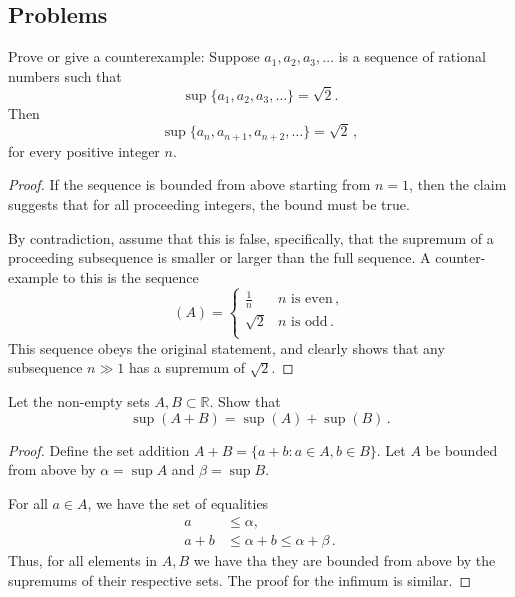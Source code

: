 \subsection{Problems}
\begin{problem}
    Prove or give a counterexample: Suppose
$a_1, a_2, a_3, \dots$ is a sequence of rational numbers such that
\[
  \sup\{a_1, a_2, a_3, \dots\} = \sqrt{2}.
\]
Then
\[
  \sup\{a_n, a_{n+1}, a_{n+2}, \dots\} = \sqrt{2}\,,
\]
for every positive integer $n$.
\end{problem}
\begin{proof}
    If the sequence is bounded from above starting from $n=1$, then the claim suggests that for all proceeding integers, the bound must be true. 

    By contradiction, assume that this is false, specifically, that the supremum of a proceeding subsequence is smaller or larger than the full sequence. A counter-example to this is the sequence
    \begin{equation*}
        (A) = \begin{cases}
            \frac{1}{n} & \text{$n$ is even}\,, \\
            \sqrt{2} & \text{$n$ is odd}\,. \\
        \end{cases}
    \end{equation*}
    This sequence obeys the original statement, and clearly shows that any subsequence $n \gg 1$ has a supremum of $\sqrt{2}$.
\end{proof}
\fullpageboxline
\begin{problem}
    Let the non-empty sets $A, B \subset \mathbb{R}$. Show that \begin{equation*}
        \sup(A + B) = \sup(A) + \sup(B)\,.
    \end{equation*}
\end{problem}
\begin{proof}
    Define the set addition $A + B = \{a + b: a \in A, b \in B\}$. Let $A$ be bounded from above by $\alpha = \sup{A}$ and $\beta = \sup B$.

    For all $a \in A$, we have the set of equalities 
    \begin{align*}
        a &\leq \alpha,\\
        a + b &\leq \alpha + b \leq \alpha + \beta\,.
    \end{align*}
    Thus, for all elements in $A, B$ we have tha they are bounded from above by the supremums of their respective sets. The proof for the infimum is similar. 
\end{proof}
\fullpageboxline

